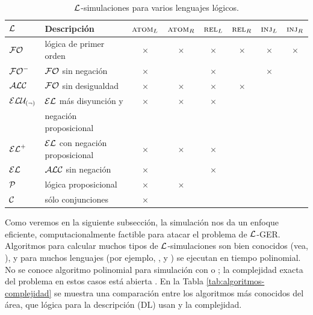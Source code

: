 \begin{table}[t]

\begin{tabular}{|l|l|cccccc|}
\hline
  $\mathcal{L}$ & Descripci\'on &$\textsc{atom}_L$ & $\textsc{atom}_R$ & $\textsc{rel}_L$ & $\textsc{rel}_R$ & $\textsc{inj}_L\space$ & $\textsc{inj}_R\space$ \\
  \hline
  $\mathcal{FO}$ & l\'ogica de primer orden & $\times$ & $\times$ & $\times$ & $\times$ & $\times$ & $\times$ \\ \hline
  ${\mathcal{FO}^-}$ & $\mathcal{FO}$ sin negaci\'on & $\times$ & & $\times$ && $\times$ & \\ \hline 
  $\mathcal{ALC}$   & $\mathcal{FO}$ sin desigualdad & $\times$ & $\times$ & $\times$ & $\times$&& \\ \hline
 
	$\mathcal{ELU_{(\neg)} }$ & $\mathcal{EL}$ m\'as disyunci\'on y  & $\times$ & $\times$ &  $\times$ & & & \\ 
	&negaci\'on proposicional&&&&&&\\ \hline
  ${\mathcal{EL}^+}$ & $\mathcal{EL}$ con negaci\'on proposicional & $\times$ & $\times$ &  $\times$ & & & \\ \hline
	$\mathcal{EL}$   & $\mathcal{ALC}$ sin negaci\'on & $\times$ & &  $\times$ & & & \\ \hline
	$\mathcal{P}$ & l\'ogica proposicional& $\times$ & $\times$ & & & & \\ \hline
	$\mathcal{C}$ & s\'olo conjunciones& $\times$ &  &  & & & \\ 
	
\hline	
\end{tabular}

\caption{$\mathcal{L}$-simulaciones para varios lenguajes l\'ogicos.}\label{tab:simuls}
\end{table}

Como veremos en la siguiente subsecci\'on, la simulaci\'on nos da un
enfoque eficiente, computacionalmente factible para atacar el problema de $\mathcal{L}$-GER. Algoritmos para calcular muchos tipos de $\mathcal{L}$-simulaciones son
bien conocidos (vea, \cite{hopc:algo71,areces08,HHK95,dovier04:_effic_algor_for_comput_bisim_equiv}), y para muchos
lenguajes (por ejemplo, \ALC, \ELAN y \EL) se ejecutan en tiempo polinomial. No se conoce algoritmo polinomial 
 para simulaci\'on con \FOL o \EPFOL; la complejidad exacta del problema en estos casos est\'a abierta \cite{gare:comp79}.
En la Tabla \ref{tab:algoritmos-complejidad} se muestra una comparaci\'on entre los algoritmos m\'as conocidos del \'area, que l\'ogica para la descripci\'on (DL) usan y la complejidad.



